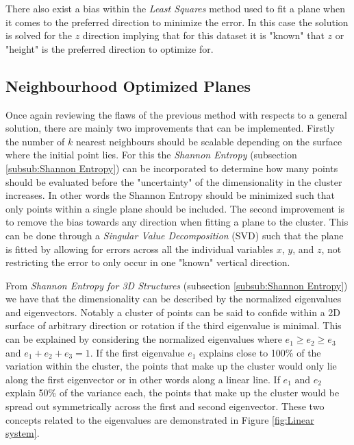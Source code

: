 \documentclass[%
]{USN-MSc}
\begin{document}
There also exist a bias within the \textit{Least Squares} method used to fit a plane when it comes to the preferred direction to minimize the error. In this case the solution is solved for the \(z\) direction implying that for this dataset it is "known" that \(z\) or "height" is the preferred direction to optimize for.

\subsection{Neighbourhood Optimized Planes}
\label{sub:Neighbourhood optimized SVD Best-Fit Planes}
Once again reviewing the flaws of the previous method with respects to a general solution, there are mainly two improvements that can be implemented. Firstly the number of \(k\) nearest neighbours should be scalable depending on the surface where the initial point lies. For this the \textit{Shannon Entropy} (subsection \ref{subsub:Shannon Entropy}) can be incorporated to determine how many points should be evaluated before the "uncertainty" of the dimensionality in the cluster increases. In other words the Shannon Entropy should be minimized such that only points within a single plane should be included. The second improvement is to remove the bias towards any direction when fitting a plane to the cluster. This can be done through a \textit{Singular Value Decomposition} (SVD) such that the plane is fitted by allowing for errors across all the individual variables \(x\), \(y\), and \(z\), not restricting the error to only occur in one "known" vertical direction.

From \textit{Shannon Entropy for 3D Structures} (subsection \ref{subsub:Shannon Entropy}) we have that the dimensionality can be described by the normalized eigenvalues and eigenvectors. Notably a cluster of points can be said to confide within a 2D surface of arbitrary direction or rotation if the third eigenvalue is minimal. This can be explained by considering the normalized eigenvalues where \(e_1 \geq e_2 \geq e_3\) and \(e_1+e_2+e_3=1\). If the first eigenvalue \(e_1\) explains close to 100\% of the variation within the cluster, the points that make up the cluster would only lie along the first eigenvector or in other words along a linear line. If \(e_1 \text{ and } e_2\) explain 50\% of the variance each, the points that make up the cluster would be spread out symmetrically across the first and second eigenvector. These two concepts related to the eigenvalues are demonstrated in Figure \ref{fig:Linear system}.
\end{document}
